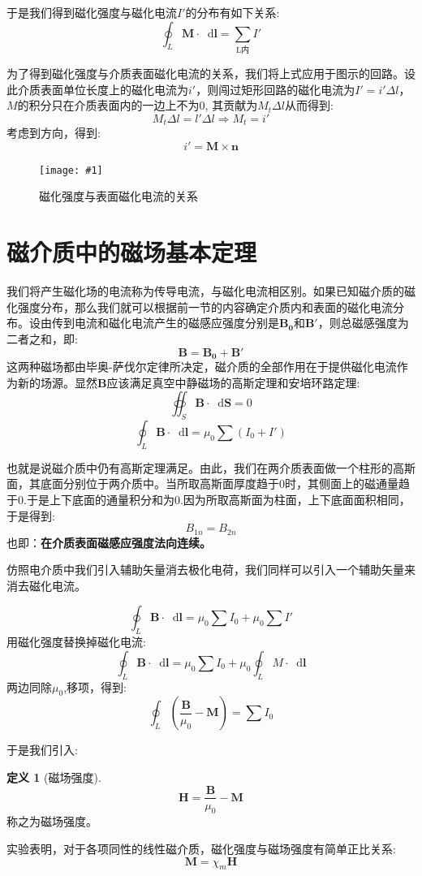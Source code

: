 \documentclass[12pt,a4paper,oneside]{report}
\theoremstyle{definition}
\newtheorem{definition}{定义}[chapter]
\theoremstyle{remark}
\newcommand{\insertfig}[3]{
    \begin{figure}[ht]
        \centering
        \texttt{[image: \#1]}
        \caption{#2}
        \label{fig:#1}
    \end{figure}
}
\newcommand{\mb}[1]{\mathbf{#1}}
\renewcommand{\d}{\mathop{}\!\mathrm{d}}
\begin{document}
于是我们得到磁化强度与磁化电流$I'$的分布有如下关系:
\[
\oint_L \mathbf{M}\cdot \d \mathbf{l} = \sum_{\text{L内}} I'
\]

为了得到磁化强度与介质表面磁化电流的关系，我们将上式应用于图示的回路。设此介质表面单位长度上的磁化电流为$i'$，则闯过矩形回路的磁化电流为$I'=i' \Delta l$，$M$的积分只在介质表面内的一边上不为$0$, 其贡献为$M_t\Delta l$从而得到:
\[
M_t \Delta l = l' \Delta l \Rightarrow M_t = i'
\]
考虑到方向，得到:
\[
i' = \mathbf{M} \times \mathbf{n}
\]

\insertfig{3-4.png}{磁化强度与表面磁化电流的关系}{0.25}

\section{磁介质中的磁场基本定理}
我们将产生磁化场的电流称为传导电流，与磁化电流相区别。如果已知磁介质的磁化强度分布，那么我们就可以根据前一节的内容确定介质内和表面的磁化电流分布。设由传到电流和磁化电流产生的磁感应强度分别是$\mathbf{B_0}$和$\mathbf{B'}$，则总磁感强度为二者之和，即:
\[
\mathbf{B} = \mathbf{B_0}+\mathbf{B'}
\]
这两种磁场都由毕奥-萨伐尔定律所决定，磁介质的全部作用在于提供磁化电流作为新的场源。显然$\mb{B}$应该满足真空中静磁场的高斯定理和安培环路定理:
\[
\oiint_S \mathbf{B} \cdot \d \mathbf{S} = 0
\]
\[
\oint_L \mathbf{B} \cdot \d \mathbf{l} = \mu_0\sum(I_0+I')
\]

也就是说磁介质中仍有高斯定理满足。由此，我们在两介质表面做一个柱形的高斯面，其底面分别位于两介质中。当所取高斯面厚度趋于$0$时，其侧面上的磁通量趋于$0$.于是上下底面的通量积分和为$0$.因为所取高斯面为柱面，上下底面面积相同，于是得到:
\[
B_{1n}=B_{2n}
\]
也即：\textbf{在介质表面磁感应强度法向连续。}

仿照电介质中我们引入辅助矢量消去极化电荷，我们同样可以引入一个辅助矢量来消去磁化电流。

\[
\oint_L \mathbf{B} \cdot \d \mathbf{l} = \mu_0\sum I_0+\mu_0\sum I'
\]
用磁化强度替换掉磁化电流:
\[
\oint_L \mathbf{B} \cdot \d \mathbf{l} = \mu_0\sum I_0+\mu_0 \oint_L M \cdot \d \mathbf{l}
\]
两边同除$\mu_0$,移项，得到:
\[
\oint_L (\frac{\mb{B}}{\mu_0}-\mb{M}) = \sum I_0
\]

于是我们引入:
\begin{definition}[磁场强度]
  

\[
\mathbf{H} = \frac{\mb{B}}{\mu_0}-\mb{M}
\]
称之为磁场强度。
\end{definition}
实验表明，对于各项同性的线性磁介质，磁化强度与磁场强度有简单正比关系:
\[
\mathbf{M} = \chi_m \mathbf{H}
\]
\end{document}

